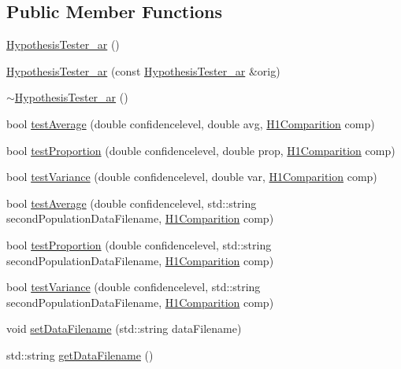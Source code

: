 \subsection*{Public Member Functions}
\begin{DoxyCompactItemize}
\item 
\hyperlink{class_hypothesis_tester__ar_a714faae8d4c744aa36875f198b28a62b}{Hypothesis\-Tester\-\_\-ar} ()
\item 
\hyperlink{class_hypothesis_tester__ar_adb4f8b0193a1819bd04a477a42398645}{Hypothesis\-Tester\-\_\-ar} (const \hyperlink{class_hypothesis_tester__ar}{Hypothesis\-Tester\-\_\-ar} \&orig)
\item 
\hyperlink{class_hypothesis_tester__ar_aa2fa81b2cf857f781df22f6f323e0c1e}{$\sim$\-Hypothesis\-Tester\-\_\-ar} ()
\item 
bool \hyperlink{class_hypothesis_tester__ar_a6c4162a031bf78abc186b788e3850705}{test\-Average} (double confidencelevel, double avg, \hyperlink{class_hypothesis_tester__if_a89153ff990252f9f79856a2f2532c349}{H1\-Comparition} comp)
\item 
bool \hyperlink{class_hypothesis_tester__ar_a8fb417811085b75f5af59c064630a6c4}{test\-Proportion} (double confidencelevel, double prop, \hyperlink{class_hypothesis_tester__if_a89153ff990252f9f79856a2f2532c349}{H1\-Comparition} comp)
\item 
bool \hyperlink{class_hypothesis_tester__ar_ad4e984e2fdd406519773b758d82470f8}{test\-Variance} (double confidencelevel, double var, \hyperlink{class_hypothesis_tester__if_a89153ff990252f9f79856a2f2532c349}{H1\-Comparition} comp)
\item 
bool \hyperlink{class_hypothesis_tester__ar_ac4aa357bf872e2185aa096f038a66291}{test\-Average} (double confidencelevel, std\-::string second\-Population\-Data\-Filename, \hyperlink{class_hypothesis_tester__if_a89153ff990252f9f79856a2f2532c349}{H1\-Comparition} comp)
\item 
bool \hyperlink{class_hypothesis_tester__ar_a782beb015c8376432be2b71cb5f36ccd}{test\-Proportion} (double confidencelevel, std\-::string second\-Population\-Data\-Filename, \hyperlink{class_hypothesis_tester__if_a89153ff990252f9f79856a2f2532c349}{H1\-Comparition} comp)
\item 
bool \hyperlink{class_hypothesis_tester__ar_a9adac84efe09fa01ff9cbc2b0a6d8d75}{test\-Variance} (double confidencelevel, std\-::string second\-Population\-Data\-Filename, \hyperlink{class_hypothesis_tester__if_a89153ff990252f9f79856a2f2532c349}{H1\-Comparition} comp)
\item 
void \hyperlink{class_hypothesis_tester__ar_a7a035cf8cb3186c94bdefe45efab34db}{set\-Data\-Filename} (std\-::string data\-Filename)
\item 
std\-::string \hyperlink{class_hypothesis_tester__ar_ae0a1ebf795bb6581a4a0d6afc2495779}{get\-Data\-Filename} ()
\end{DoxyCompactItemize}
